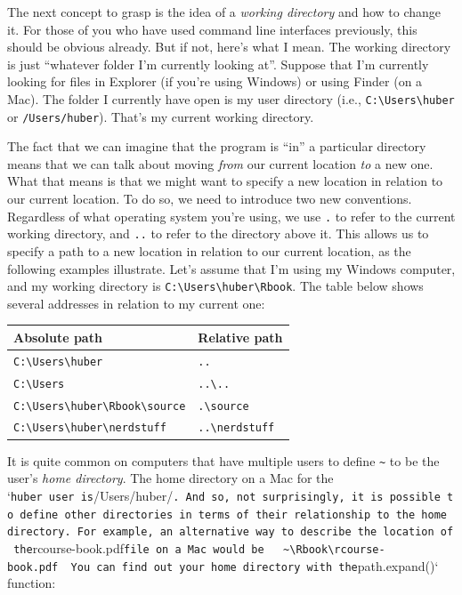 \documentclass[
  12pt,
  oneside]{book}
\theoremstyle{definition}
\theoremstyle{definition}
\theoremstyle{definition}
\theoremstyle{definition}
\theoremstyle{remark}
\begin{document}
The next concept to grasp is the idea of a \emph{working directory} and how to change it. For those of you who have used command line interfaces previously, this should be obvious already. But if not, here's what I mean. The working directory is just ``whatever folder I'm currently looking at''. Suppose that I'm currently looking for files in Explorer (if you're using Windows) or using Finder (on a Mac). The folder I currently have open is my user directory (i.e., \texttt{C:\textbackslash{}Users\textbackslash{}huber} or \texttt{/Users/huber}). That's my current working directory.

The fact that we can imagine that the program is ``in'' a particular directory means that we can talk about moving \emph{from} our current location \emph{to} a new one. What that means is that we might want to specify a new location in relation to our current location. To do so, we need to introduce two new conventions. Regardless of what operating system you're using, we use \texttt{.} to refer to the current working directory, and \texttt{..} to refer to the directory above it. This allows us to specify a path to a new location in relation to our current location, as the following examples illustrate. Let's assume that I'm using my Windows computer, and my working directory is \texttt{C:\textbackslash{}Users\textbackslash{}huber\textbackslash{}Rbook}. The table below shows several addresses in relation to my current one:

\begin{longtable}[]{@{}ll@{}}
\toprule()
Absolute path & Relative path \\
\midrule()
\endhead
\texttt{C:\textbackslash{}Users\textbackslash{}huber} & \texttt{..} \\
\texttt{C:\textbackslash{}Users} & \texttt{..\textbackslash{}..} \\
\texttt{C:\textbackslash{}Users\textbackslash{}huber\textbackslash{}Rbook\textbackslash{}source} & \texttt{.\textbackslash{}source} \\
\texttt{C:\textbackslash{}Users\textbackslash{}huber\textbackslash{}nerdstuff} & \texttt{..\textbackslash{}nerdstuff} \\
\bottomrule()
\end{longtable}

It is quite common on computers that have multiple users to define \texttt{\textasciitilde{}} to be the user's \emph{home directory}. The home directory on a Mac for the `\texttt{huber\textquotesingle{}\textquotesingle{}\ user\ is}/Users/huber/\texttt{.\ And\ so,\ not\ surprisingly,\ it\ is\ possible\ to\ define\ other\ directories\ in\ terms\ of\ their\ relationship\ to\ the\ home\ directory.\ For\ example,\ an\ alternative\ way\ to\ describe\ the\ location\ of\ the}rcourse-book.pdf\texttt{file\ on\ a\ Mac\ would\ be\ \ \textasciigrave{}\textasciigrave{}\textasciigrave{}\ \textasciitilde{}\textbackslash{}Rbook\textbackslash{}rcourse-book.pdf\ \textasciigrave{}\textasciigrave{}\textasciigrave{}\ You\ can\ find\ out\ your\ home\ directory\ with\ the}path.expand()` function:
\end{document}
